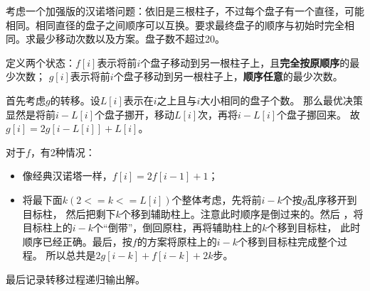 \begin{prob}
	考虑一个加强版的汉诺塔问题：依旧是三根柱子，不过每个盘子有一个直径，可能相同。相同直径的盘子之间顺序可以互换。要求最终盘子的顺序与初始时完全相同。求最少移动次数以及方案。盘子数不超过20。
\end{prob}

\begin{sol}
	定义两个状态：$f[i]$表示将前$i$个盘子移动到另一根柱子上，且\textbf{完全按原顺序}的最少次数；
	$g[i]$表示将前$i$个盘子移动到另一根柱子上，\textbf{顺序任意}的最少次数。\par
	首先考虑$g$的转移。设$L[i]$表示在$i$之上且与$i$大小相同的盘子个数。
	那么最优决策显然是将前$i-L[i]$个盘子挪开，移动$L[i]$次，再将$i-L[i]$个盘子挪回来。
	故$g[i]=2g[i-L[i]]+L[i]$。 \par
	对于$f$，有2种情况：
	\begin{itemize}
		\item 像经典汉诺塔一样，$f[i]=2f[i-1]+1$；
		\item 将最下面$k(2<=k<=L[i])$个整体考虑，先将前$i-k$个按$g$乱序移开到目标柱，
			然后把剩下$k$个移到辅助柱上。注意此时顺序是倒过来的。然后
			，将目标柱上的$i-k$个“倒带”，倒回原柱，再将辅助柱上的$k$个移到目标柱，
			此时顺序已经正确。最后，按$f$的方案将原柱上的$i-k$个移到目标柱完成整个过程。
			所以总共是$2g[i-k]+f[i-k]+2k$步。
	\end{itemize}
	最后记录转移过程递归输出解。
\end{sol}
